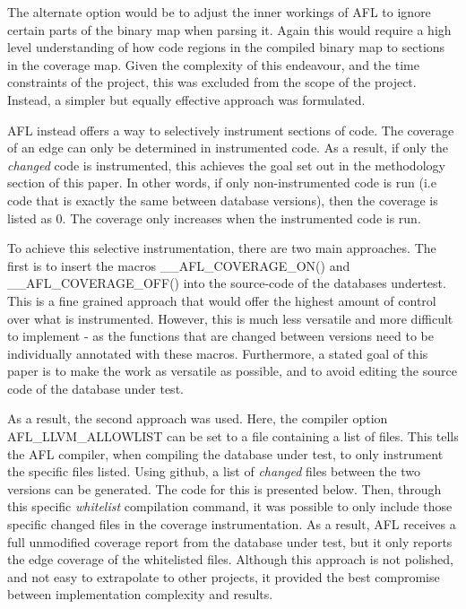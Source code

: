 \documentclass[sigconf]{acmart}
\begin{document}
The alternate option would be to adjust the inner workings of AFL to ignore certain parts of the binary map when parsing it. Again this would require a high level understanding of how code regions in the compiled binary map to sections in the coverage map. Given the complexity of this endeavour, and the time constraints of the project, this was excluded from the scope of the project. Instead, a simpler but equally effective approach was formulated. 

AFL instead offers a way to selectively instrument sections of code. The coverage of an edge can only be determined in instrumented code. As a result, if only the \textit{changed} code is instrumented, this achieves the goal set out in the methodology section of this paper. In other words, if only non-instrumented code is run (i.e code that is exactly the same between database versions), then the coverage is listed as 0. The coverage only increases when the instrumented code is run.

To achieve this selective instrumentation, there are two main approaches. The first is to insert the macros \_\_AFL\_COVERAGE\_ON() and \_\_AFL\_COVERAGE\_OFF() into the source-code of the databases undertest. This is a fine grained approach that would offer the highest amount of control over what is instrumented. However, this is much less versatile and more difficult to implement - as the functions that are changed between versions need to be individually annotated with these macros. Furthermore, a stated goal of this paper is to make the work as versatile as possible, and to avoid editing the source code of the database under test.

As a result, the second approach was used. Here, the compiler option AFL\_LLVM\_ALLOWLIST can be set to a file containing a list of files. This tells the AFL compiler, when compiling the database under test, to only instrument the specific files listed. Using github, a list of \textit{changed} files between the two versions can be generated. The code for this is presented below. Then, through this specific \textit{whitelist} compilation command, it was possible to only include those specific changed files in the coverage instrumentation. As a result, AFL receives a full unmodified coverage report from the database under test, but it only reports the edge coverage of the whitelisted files. Although this approach is not polished, and not easy to extrapolate to other projects, it provided the best compromise between implementation complexity and results.
\end{document}
